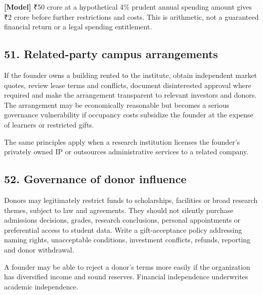 \textbf{[Model]} \textnormal{₹}50 crore at a hypothetical 4\% prudent annual spending amount gives \textnormal{₹}2 crore before further restrictions and costs. This is arithmetic, not a guaranteed financial return or a legal spending entitlement.

\subsection{51. Related-party campus arrangements}

If the founder owns a building rented to the institute, obtain independent market quotes, review lease terms and conflicts, document disinterested approval where required and make the arrangement transparent to relevant investors and donors. The arrangement may be economically reasonable but becomes a serious governance vulnerability if occupancy costs subsidize the founder at the expense of learners or restricted gifts.

The same principles apply when a research institution licenses the founder's privately owned IP or outsources administrative services to a related company.

\subsection{52. Governance of donor influence}

Donors may legitimately restrict funds to scholarships, facilities or broad research themes, subject to law and agreements. They should not silently purchase admissions decisions, grades, research conclusions, personal appointments or preferential access to student data. Write a gift-acceptance policy addressing naming rights, unacceptable conditions, investment conflicts, refunds, reporting and donor withdrawal.

A founder may be able to reject a donor's terms more easily if the organization has diversified income and sound reserves. Financial independence underwrites academic independence.
